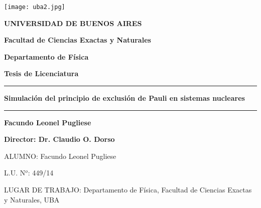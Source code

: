 \thispagestyle{empty}

\begin {center}

\texttt{[image: uba2.jpg]}

\medskip
\textbf{UNIVERSIDAD DE BUENOS AIRES}

\smallskip

\textbf{Facultad de Ciencias Exactas y Naturales}

\smallskip

\textbf{Departamento de Física}

\vspace{2.5cm}

\textbf{\large Tesis de Licenciatura}

\vspace{0.5cm}

\rule{150mm}{0.5mm}

\vspace{0.5cm}

\textbf{\LARGE Simulación del principio de exclusión de Pauli en sistemas nucleares}

\vspace{0.5cm}

\rule{150mm}{0.5mm}

\vspace{0.5cm}

\textbf{\large Facundo Leonel Pugliese}

\end {center}


\vspace{1.5cm}

\noindent \textbf{Director: Dr. Claudio O. Dorso} 


\vspace{3cm}


\newpage
\thispagestyle{empty}


\vspace{11pt}

ALUMNO: Facundo Leonel Pugliese

\vspace{11pt}

L.U. N$^o$: 449/14

\vspace{11pt}

LUGAR DE TRABAJO: Departamento de Física, Facultad de Ciencias Exactas y Naturales, UBA

